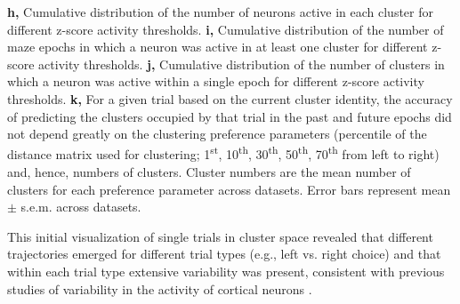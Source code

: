 \begin{FPfigure}
{%
\textbf{h,} Cumulative distribution of the number of neurons active in each cluster for different z-score activity thresholds. 
%
\textbf{i,} Cumulative distribution of the number of maze epochs in which a neuron was active in at least one cluster for different z-score activity thresholds. 
%
\textbf{j,} Cumulative distribution of the number of clusters in which a neuron was active within a single epoch for different z-score activity thresholds. 
%
\textbf{k,} For a given trial based on the current cluster identity, the accuracy of predicting the clusters occupied by that trial in the past and future epochs did not depend greatly on the clustering preference parameters (percentile of the distance matrix used for clustering; 1\textsuperscript{st}, 10\textsuperscript{th}, 30\textsuperscript{th}, 50\textsuperscript{th}, 70\textsuperscript{th} from left to right) and, hence, numbers of clusters. Cluster numbers are the mean number of clusters for each preference parameter across datasets. Error bars represent mean $\pm$ s.e.m. across datasets. 
\label{fig:3_7}}
\end{FPfigure}
\clearpage

This initial visualization of single trials in cluster space revealed that different trajectories emerged for different trial types (e.g., left vs. right choice) and that within each trial type extensive variability was present, consistent with previous studies of variability in the activity of cortical neurons \citep{Britten:1992wx, Renart:2014drba, Marcos:2013byba, Churchland:2010he, Churchland:2011hd, Maimon:2009hg}.

